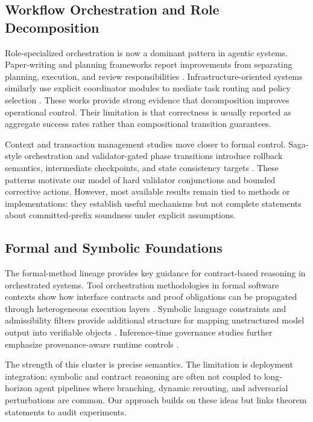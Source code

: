 \documentclass{article} %
\begin{document}
\subsection{Workflow Orchestration and Role Decomposition}
Role-specialized orchestration is now a dominant pattern in agentic systems. Paper-writing and planning frameworks report improvements from separating planning, execution, and review responsibilities \citep{song2026,chang2025,marozau2025,medeiros2025}. Infrastructure-oriented systems similarly use explicit coordinator modules to mediate task routing and policy selection \citep{wang2025b,sun2025,ihaddaden2025}. These works provide strong evidence that decomposition improves operational control. Their limitation is that correctness is usually reported as aggregate success rates rather than compositional transition guarantees.

Context and transaction management studies move closer to formal control. Saga-style orchestration and validator-gated phase transitions introduce rollback semantics, intermediate checkpoints, and state consistency targets \citep{chang2025,sawant2026}. These patterns motivate our model of hard validator conjunctions and bounded corrective actions. However, most available results remain tied to methods or implementations: they establish useful mechanisms but not complete statements about committed-prefix soundness under explicit assumptions.

\subsection{Formal and Symbolic Foundations}
The formal-method lineage provides key guidance for contract-based reasoning in orchestrated systems. Tool orchestration methodologies in formal software contexts show how interface contracts and proof obligations can be propagated through heterogeneous execution layers \citep{song2026b}. Symbolic language constraints and admissibility filters provide additional structure for mapping unstructured model output into verifiable objects \citep{dinu2024}. Inference-time governance studies further emphasize provenance-aware runtime controls \citep{glas2026}.

The strength of this cluster is precise semantics. The limitation is deployment integration: symbolic and contract reasoning are often not coupled to long-horizon agent pipelines where branching, dynamic rerouting, and adversarial perturbations are common. Our approach builds on these ideas but links theorem statements to audit experiments.
\end{document}
